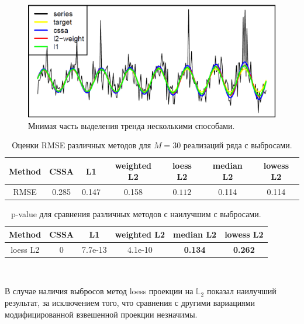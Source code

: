 \documentclass[specialist,
               substylefile = spbu.rtx,
               subf,href,colorlinks=true, 12pt]{disser}
\begin{document}
\begin{figure}[H]
	\begin{center}
		\includegraphics[width=0.67\linewidth]{analys_1_Im.png}
	\end{center}
	\caption{Мнимая часть выделения тренда несколькими способами.}
	\label{analys_Im_1}
\end{figure}

\begin{table}[H]
	\begin{center}
		\caption{Оценки RMSE различных методов для $M = 30$ реализаций ряда с выбросами.}
		\label{tab2}
		\begin{tabular}{|c|c|c|c|c|c|c|}
			\hline
			Method 	& CSSA & L1 & weighted L2 & loess L2 & median L2 & lowess L2 \\ 
			\hline
			RMSE & 0.285  & 0.147  & 0.158 & $\mathbf{0.112}$ & 0.114 & 0.114\\
			\hline
		\end{tabular}
	\end{center}
\end{table}

\begin{table}[H]
	\caption{p-value для сравнения различных методов с наилучшим с выбросами.}
	\label{tab: pval2}
	\begin{center}
		\begin{tabular}{|c|c|c|c|c|c|}
			\hline
			Method & CSSA	& L1 & weighted L2 & median L2 & lowess L2  \\ 
			\hline
			loess L2 & 0  & 7.7e-13 &   4.1e-10  &  \textbf{0.134} & \textbf{0.262}  \\
			\hline
		\end{tabular} \\
	\end{center}
\end{table}

В случае наличия выбросов метод loess проекции на $\mathbb{L}_2$ показал наилучший результат, за исключением того, что сравнения с другими вариациями модифицированной взвешенной проекции незначимы.
\end{document}
